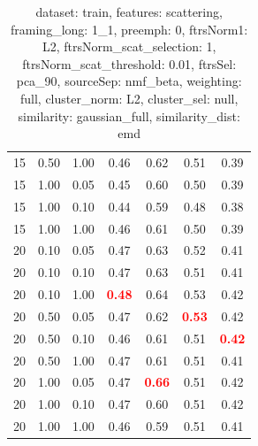 \documentclass[12pt,a4paper,fleqn]{tufte-handout}
\begin{document}
\begin{table}
\begin{center}
\begin{tabular}{lllcccc}
15 & 0.50 & 1.00 & 0.46 & 0.62 & 0.51 & 0.39 \\           
15 & 1.00 & 0.05 & 0.45 & 0.60 & 0.50 & 0.39 \\           
15 & 1.00 & 0.10 & 0.44 & 0.59 & 0.48 & 0.38 \\           
15 & 1.00 & 1.00 & 0.46 & 0.61 & 0.50 & 0.39 \\           
20 & 0.10 & 0.05 & 0.47 & 0.63 & 0.52 & 0.41 \\           
20 & 0.10 & 0.10 & 0.47 & 0.63 & 0.51 & 0.41 \\           
20 & 0.10 & 1.00 & \textbf{\textcolor{red}{0.48}} & 0.64 & 0.53 & 0.42 \\           
20 & 0.50 & 0.05 & 0.47 & 0.62 & \textbf{\textcolor{red}{0.53}} & 0.42 \\           
20 & 0.50 & 0.10 & 0.46 & 0.61 & 0.51 & \textbf{\textcolor{red}{0.42}} \\           
20 & 0.50 & 1.00 & 0.47 & 0.61 & 0.51 & 0.41 \\           
20 & 1.00 & 0.05 & 0.47 & \textbf{\textcolor{red}{0.66}} & 0.51 & 0.42 \\           
20 & 1.00 & 0.10 & 0.47 & 0.60 & 0.51 & 0.42 \\           
20 & 1.00 & 1.00 & 0.46 & 0.59 & 0.51 & 0.41 \\           
\end{tabular}           
\end{center}           
\caption{dataset: train, features: scattering, framing\_long: 1\_1, preemph: 0, ftrsNorm1: L2, ftrsNorm\_scat\_selection: 1, ftrsNorm\_scat\_threshold: 0.01, ftrsSel: pca\_90, sourceSep: nmf\_beta, weighting: full, cluster\_norm: L2, cluster\_sel: null, similarity: gaussian\_full, similarity\_dist: emd}           
\label{datasetrFeaturscFraminlong1_1Preemp0Ftrsnorm1L2Ftrsnoscatselect1Ftrsnoscatthresh0.01Ftrsselpc90SourcesepnmbeWeightfuClustenormL2ClusteselnuSimilagafuSimiladistem}           
\end{table}           
 
\end{document}
